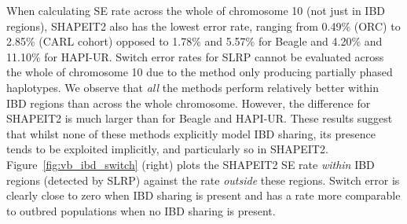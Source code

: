 When calculating SE rate across the whole of chromosome 10 (not just in IBD regions), SHAPEIT2 also has the lowest error rate, ranging from 0.49\% (ORC) to 2.85\% (CARL cohort) opposed to 1.78\% and 5.57\% for Beagle and 4.20\% and 11.10\% for HAPI-UR. Switch error rates for SLRP cannot be evaluated across the whole of chromosome 10 due to the method only producing partially phased haplotypes.  We observe that \emph{all} the methods perform relatively better within IBD regions than across the whole chromosome. However, the difference for SHAPEIT2 is much larger than for Beagle and HAPI-UR. These results suggest that whilst none of these methods explicitly model IBD sharing, its presence tends to be exploited implicitly, and particularly so in SHAPEIT2. Figure~\ref{fig:vb_ibd_switch} (right)  plots the SHAPEIT2 SE rate \emph{within} IBD regions (detected by SLRP) against the rate \emph{outside} these regions. Switch error is clearly close to zero when IBD sharing is present and has a rate more comparable to outbred populations when no IBD sharing is present.
